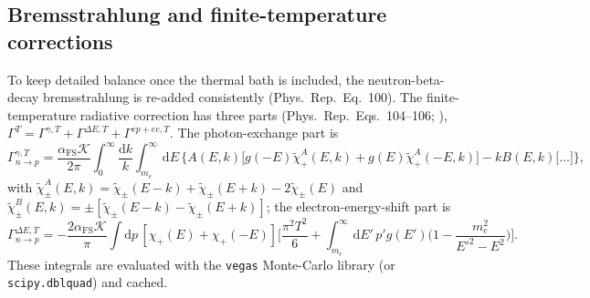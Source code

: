 \documentclass[11pt,a4paper]{article}
\newcommand{\dd}{\mathrm{d}}
\newcommand{\code}[1]{\texttt{#1}}
\newcommand{\PR}{Phys.\ Rep.}
\newcommand{\Kw}{\mathcal{K}}
\newcommand{\afs}{\alpha_{\mathrm{FS}}}
\begin{document}
\subsection*{Bremsstrahlung and finite-temperature corrections}
To keep detailed balance once the thermal bath is included, the
neutron-beta-decay bremsstrahlung is re-added consistently (\PR\ Eq.~100). The
finite-temperature radiative correction has three parts (\PR\ Eqs.~104--106;
\cite{BrownSawyer}),
$\Gamma^{T}=\Gamma^{\gamma,T}+\Gamma^{\Delta E,T}+\Gamma^{ep+ee,T}$. The
photon-exchange part is
\begin{equation}
  \Gamma^{\gamma,T}_{n\to p}=\frac{\afs\Kw}{2\pi}\!\int_0^\infty\!\frac{\dd k}{k}
    \!\int_{m_e}^\infty\!\dd E\,
    \Big\{A(E,k)\big[g(-E)\tilde\chi^A_+(E,k)+g(E)\tilde\chi^A_+(-E,k)\big]
    - kB(E,k)\big[\dots\big]\Big\},
\end{equation}
with $\tilde\chi^A_\pm(E,k)=\tilde\chi_\pm(E-k)+\tilde\chi_\pm(E+k)-2\tilde\chi_\pm(E)$
and $\tilde\chi^B_\pm(E,k)=\pm[\tilde\chi_\pm(E-k)-\tilde\chi_\pm(E+k)]$; the
electron-energy-shift part is
\begin{equation}
  \Gamma^{\Delta E,T}_{n\to p}=-\frac{2\afs\Kw}{\pi}\!\int\!\dd p\,
    [\chi_+(E)+\chi_+(-E)]
    \Big[\frac{\pi^2T^2}{6}+\!\int_{m_e}^\infty\!\dd E'\,p'g(E')
    \Big(1-\frac{m_e^2}{E'^2-E^2}\Big)\Big].
\end{equation}
These integrals are evaluated with the \code{vegas} Monte-Carlo library (or
\code{scipy.dblquad}) and cached.
\end{document}
